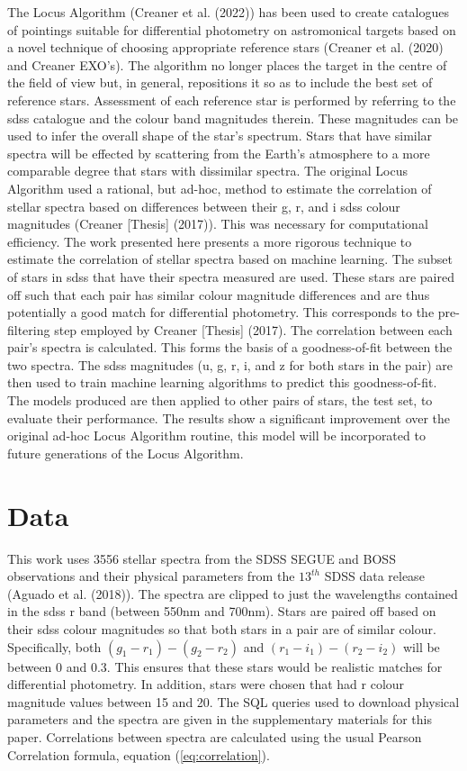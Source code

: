\documentclass[]{elsarticle} %
\begin{document}
The Locus Algorithm (Creaner et al. (2022)) has been used to create
catalogues of pointings suitable for differential photometry on
astromonical targets based on a novel technique of choosing appropriate
reference stars (Creaner et al. (2020) and Creaner EXO's). The algorithm
no longer places the target in the centre of the field of view but, in
general, repositions it so as to include the best set of reference
stars. Assessment of each reference star is performed by referring to
the sdss catalogue and the colour band magnitudes therein. These
magnitudes can be used to infer the overall shape of the star's
spectrum. Stars that have similar spectra will be effected by scattering
from the Earth's atmosphere to a more comparable degree that stars with
dissimilar spectra. The original Locus Algorithm used a rational, but
ad-hoc, method to estimate the correlation of stellar spectra based on
differences between their g, r, and i sdss colour magnitudes (Creaner
{[}Thesis{]} (2017)). This was necessary for computational efficiency.
The work presented here presents a more rigorous technique to estimate
the correlation of stellar spectra based on machine learning. The subset
of stars in sdss that have their spectra measured are used. These stars
are paired off such that each pair has similar colour magnitude
differences and are thus potentially a good match for differential
photometry. This corresponds to the pre-filtering step employed by
Creaner {[}Thesis{]} (2017). The correlation between each pair's spectra
is calculated. This forms the basis of a goodness-of-fit between the two
spectra. The sdss magnitudes (u, g, r, i, and z for both stars in the
pair) are then used to train machine learning algorithms to predict this
goodness-of-fit. The models produced are then applied to other pairs of
stars, the test set, to evaluate their performance. The results show a
significant improvement over the original ad-hoc Locus Algorithm
routine, this model will be incorporated to future generations of the
Locus Algorithm.

\hypertarget{data}{%
\section{Data}\label{data}}

This work uses 3556 stellar spectra from the SDSS SEGUE and BOSS
observations and their physical parameters from the \(13^{th}\) SDSS
data release (Aguado et al. (2018)). The spectra are clipped to just the
wavelengths contained in the sdss r band (between 550nm and 700nm).
Stars are paired off based on their sdss colour magnitudes so that both
stars in a pair are of similar colour. Specifically, both
\((g_1-r_1)-(g_2-r_2)\) and \((r_1-i_1)-(r_2-i_2)\) will be between 0
and 0.3. This ensures that these stars would be realistic matches for
differential photometry. In addition, stars were chosen that had r
colour magnitude values between 15 and 20. The SQL queries used to
download physical parameters and the spectra are given in the
supplementary materials for this paper. Correlations between spectra are
calculated using the usual Pearson Correlation formula, equation
(\ref{eq:correlation}).
\end{document}
